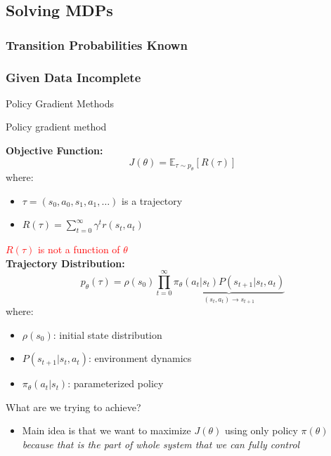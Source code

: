 \documentclass[10pt]{beamer}
\begin{document}
\subsection{Solving MDPs}
\subsubsection{Transition Probabilities Known}
\subsubsection{Given Data Incomplete}

\begin{frame}
    \begin{center}
        Policy Gradient Methods
    \end{center}
\end{frame}

\begin{frame}{Policy gradient method}

    \textbf{Objective Function:}
    \[
    J(\theta) = \mathbb{E}_{\tau \sim p_{\theta}}[R(\tau)]
    \]
    where:
    \begin{itemize}
        \item $\tau = (s_0, a_0, s_1, a_1, \ldots)$ is a trajectory  
        \item $R(\tau) = \sum_{t=0}^{\infty} \gamma^t r(s_t, a_t)$
    \end{itemize}
    \textcolor{red}{$R(\tau)$ is not a function of $\theta$}\\
\pause
    \textbf{Trajectory Distribution:}
    \[
    p_{\theta}(\tau)  = \rho(s_0) \prod_{t=0}^{\infty} \underbrace{\pi_\theta(a_t|s_t)P(s_{t+1}|s_t, a_t)}_{(s_t,a_t) \to s_{t+1}}
    \]
    where:
    \begin{itemize}
        \item $\rho(s_0)$: initial state distribution  
        \item $P(s_{t+1} | s_t, a_t)$: environment dynamics  
        \item $\pi_{\theta}(a_t | s_t)$: parameterized policy  
    \end{itemize}
\end{frame}

\begin{frame}{What are we trying to achieve?}

\begin{itemize}
\item Main idea is that we want to maximize $J(\theta)$ using only policy $\pi(\theta)$ \textit{because that is the part of whole system that we can fully control} 

\end{itemize}

\end{frame}
\end{document}
